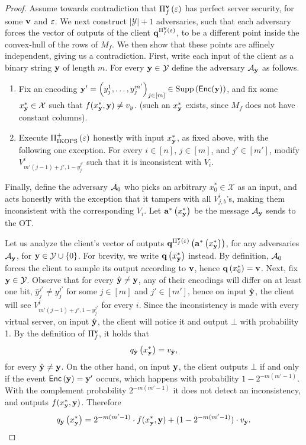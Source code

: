 \documentclass{llncs}
\newcommand{\X}{\mathcal{X}}
\newcommand{\Y}{\mathcal{Y}}
\renewcommand{\q}{\myvec{q}}
\renewcommand{\v}{\myvec{v}}
\renewcommand{\a}{\myvec{a}}
\newcommand{\y}{\myvec{y}}
\newcommand{\IKOPS}{\operatorname{IKOPS}}
\renewcommand{\Enc}{\mathsf{Enc}}
\begin{document}
\begin{proof}
Assume towards contradiction that $\Pi_f^{\v}\of{\eps}$ has perfect server security, for some $\v$ and $\varepsilon$. We next construct $|\Y|+1$ adversaries, such that each adversary forces the vector of outputs of the client $\q^{\Pi_f^{\v}\of{\eps}}$, to be a different point inside the convex-hull of the rows of $M_f$. We then show that these points are affinely independent, giving us a contradiction. First, write each input of the client as a binary string $\y$ of length $m$. For every $\y\in\Y$ define the adversary $\adv_\y$ as follows.
\begin{enumerate}
\item Fix an encoding $\y'=\vect{y_j^1,\ldots,y_j^{m'}}_{j\in[m]}\in\Supp\of{\Enc(\y)}$, and fix some $x^*_{\y}\in\X$ such that $f(x^*_{\y},\y)\neq v_y$. (such an $x^*_{\y}$ exists, since $M_f$ does not have constant columns).
\item Execute $\Pi_{\IKOPS}^{+}\of{\eps}$ honestly with input $x^*_{\y}$, as fixed above, with the following one exception.
For every $i\in[n]$, $j\in[m]$, and $j'\in[m']$, modify $V^i_{m'(j-1)+j',1 - y^{j'}_j}$ such that it is inconsistent with $V_i$.
\end{enumerate}
Finally, define the adversary $\mathcal{A}_0$ who picks an arbitrary $x^*_0\in\X$ as an input, and acts honestly with the exception that it tampers with all $V^i_{j,b}$'s, making them inconsistent with the corresponding $V_i$. Let $\a^*\of{x_{\y}^*}$ be the message $\adv_\y$ sends to the OT.

Let us analyze the client's vector of outputs $\q^{\Pi_f^{\v}\of{\eps}}\of{\a^*\of{x_{\y}^*}}$, for any adversaries $\adv_{\y}$, for $\y\in\Y\cup\set{0}$. For brevity, we write $\q\of{x^*_{\y}}$ instead. By definition, $\mathcal{A}_0$ forces the client to sample its output according to $\v$, hence $\q\of{x^*_0}=\v$. Next, fix $\y\in\Y$. Observe that for every $\hat{\y}\neq\y$, any of their encodings will differ on at least one bit, \ie $\hat{y}_j^{j'}\neq y_j^{j'}$ for some $j\in[m]$ and $j'\in[m']$, hence on input $\hat{\y}$, the client will see $V^i_{m'(j-1)+j',1 - y^{j'}_j}$ for every $i$. Since the inconsistency is made with every virtual server, on input $\hat{\y}$, the client will notice it and output $\bot$ with probability 1. By the definition of $\Pi_f^{\v}$, it holds that 
\begin{align}\label{eq:othery}
q_{\hat{\y}}\of{x^*_{\y}}=v_{\hat{\y}},
\end{align}
for every $\hat{\y}\ne \y$. On the other hand, on input $\y$, the client outputs $\bot$ if and only if the event $\Enc\of{\y}=\y'$ occurs, which happens with probability $1-2^{-m(m'-1)}$. With the complement probability $2^{-m(m'-1)}$ it does not detect an inconsistency, and outputs $f(x^*_{\y},\y)$. Therefore
\begin{align}\label{eq:samey}
q_\y\of{x^*_{\y}}=2^{-m(m'-1)}\cdot f(x^*_{\y},\y)+(1-2^{-m(m'-1)})\cdot v_{\y}.
\end{align}


\end{proof}
\end{document}
